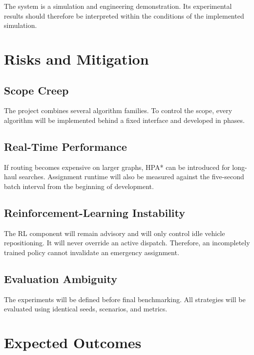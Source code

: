 \documentclass[12pt,a4paper]{article}
\begin{document}
The system is a simulation and engineering demonstration. Its
experimental results should therefore be interpreted within the
conditions of the implemented simulation.





\section{Risks and Mitigation}

\subsection{Scope Creep}

The project combines several algorithm families. To control the
scope, every algorithm will be implemented behind a fixed interface
and developed in phases.

\subsection{Real-Time Performance}

If routing becomes expensive on larger graphs, HPA* can be introduced
for long-haul searches. Assignment runtime will also be measured
against the five-second batch interval from the beginning of
development.

\subsection{Reinforcement-Learning Instability}

The RL component will remain advisory and will only control idle
vehicle repositioning. It will never override an active dispatch.
Therefore, an incompletely trained policy cannot invalidate an
emergency assignment.

\subsection{Evaluation Ambiguity}

The experiments will be defined before final benchmarking. All
strategies will be evaluated using identical seeds, scenarios, and
metrics.





\section{Expected Outcomes}
\end{document}
